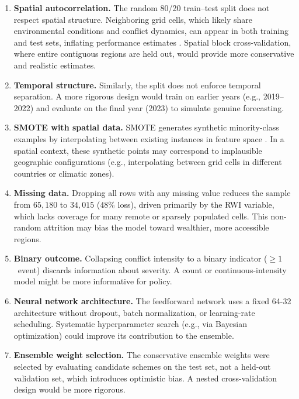 \documentclass[11pt,a4paper]{article}
\begin{document}
\begin{enumerate}
  \item \textbf{Spatial autocorrelation.} The random 80/20 train--test split does not respect spatial structure. Neighboring grid cells, which likely share environmental conditions and conflict dynamics, can appear in both training and test sets, inflating performance estimates \parencite{roberts2017crossvalidation}. Spatial block cross-validation, where entire contiguous regions are held out, would provide more conservative and realistic estimates.

  \item \textbf{Temporal structure.} Similarly, the split does not enforce temporal separation. A more rigorous design would train on earlier years (e.g., 2019--2022) and evaluate on the final year (2023) to simulate genuine forecasting.

  \item \textbf{SMOTE with spatial data.} SMOTE generates synthetic minority-class examples by interpolating between existing instances in feature space \parencite{chawla2002smote}. In a spatial context, these synthetic points may correspond to implausible geographic configurations (e.g., interpolating between grid cells in different countries or climatic zones).

  \item \textbf{Missing data.} Dropping all rows with any missing value reduces the sample from $65{,}180$ to $34{,}015$ ($48\%$ loss), driven primarily by the RWI variable, which lacks coverage for many remote or sparsely populated cells. This non-random attrition may bias the model toward wealthier, more accessible regions.

  \item \textbf{Binary outcome.} Collapsing conflict intensity to a binary indicator ($\geq 1$~event) discards information about severity. A count or continuous-intensity model might be more informative for policy.

  \item \textbf{Neural network architecture.} The feedforward network uses a fixed 64-32 architecture without dropout, batch normalization, or learning-rate scheduling. Systematic hyperparameter search (e.g., via Bayesian optimization) could improve its contribution to the ensemble.

  \item \textbf{Ensemble weight selection.} The conservative ensemble weights were selected by evaluating candidate schemes on the test set, not a held-out validation set, which introduces optimistic bias. A nested cross-validation design would be more rigorous.
\end{enumerate}
\end{document}
